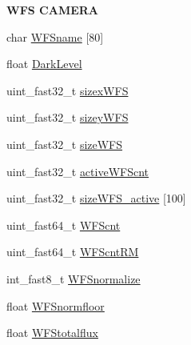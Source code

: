 \begin{Indent}{\bf W\+F\+S C\+A\+M\+E\+R\+A}\par
\begin{DoxyCompactItemize}
\item 
char \hyperlink{structAOLOOPCONTROL__CONF_a18a75018d87159819342add7bf9e79fb}{W\+F\+Sname} \mbox{[}80\mbox{]}
\item 
float \hyperlink{structAOLOOPCONTROL__CONF_ab68c979746a1ac6e411a367121fc3633}{Dark\+Level}
\item 
uint\+\_\+fast32\+\_\+t \hyperlink{structAOLOOPCONTROL__CONF_ade6b11cba36b5349be3bb528565d1fb6}{sizex\+W\+F\+S}
\item 
uint\+\_\+fast32\+\_\+t \hyperlink{structAOLOOPCONTROL__CONF_aa74e23cd13599fa8f18a7c18f71bc2cd}{sizey\+W\+F\+S}
\item 
uint\+\_\+fast32\+\_\+t \hyperlink{structAOLOOPCONTROL__CONF_a002396aa70f161adb518d5c862cface6}{size\+W\+F\+S}
\item 
uint\+\_\+fast32\+\_\+t \hyperlink{structAOLOOPCONTROL__CONF_aeea125f93585b4ec719064ce68b51133}{active\+W\+F\+Scnt}
\item 
uint\+\_\+fast32\+\_\+t \hyperlink{structAOLOOPCONTROL__CONF_aff1600430518d3c5ad2f08be3edba96b}{size\+W\+F\+S\+\_\+active} \mbox{[}100\mbox{]}
\item 
uint\+\_\+fast64\+\_\+t \hyperlink{structAOLOOPCONTROL__CONF_a2402535e7cff34f3214c2786c38c3e4b}{W\+F\+Scnt}
\item 
uint\+\_\+fast64\+\_\+t \hyperlink{structAOLOOPCONTROL__CONF_a670343e3030850651f0da32276ce2372}{W\+F\+Scnt\+R\+M}
\item 
int\+\_\+fast8\+\_\+t \hyperlink{structAOLOOPCONTROL__CONF_a78221aaced7c48e38b8ffe3a45e605ca}{W\+F\+Snormalize}
\item 
float \hyperlink{structAOLOOPCONTROL__CONF_abd08de6307435bc1a73849ae8f784169}{W\+F\+Snormfloor}
\item 
float \hyperlink{structAOLOOPCONTROL__CONF_ab19e1ec513dfe03aef82717b63466374}{W\+F\+Stotalflux}
\end{DoxyCompactItemize}
\end{Indent}

